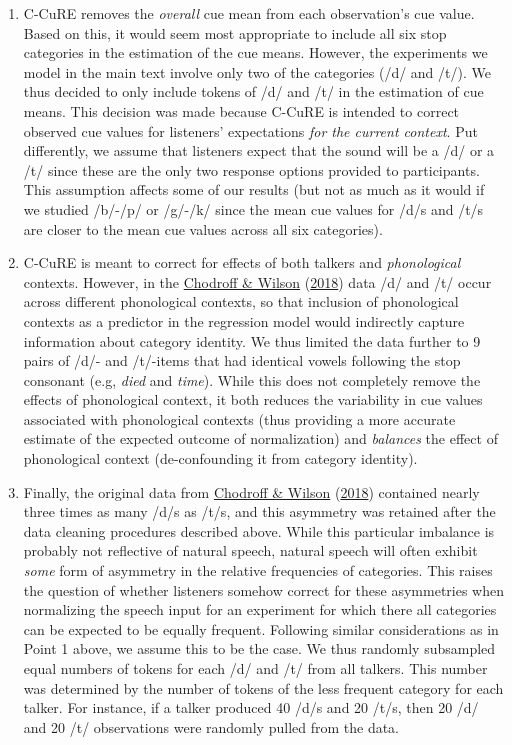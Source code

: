 \documentclass[
  11pt,
  english,
  man,floatsintext]{apa6}
\begin{document}
\begin{enumerate}
\def\labelenumi{\arabic{enumi}.}
\item
  C-CuRE removes the \emph{overall} cue mean from each observation's cue value. Based on this, it would seem most appropriate to include all six stop categories in the estimation of the cue means. However, the experiments we model in the main text involve only two of the categories (/d/ and /t/). We thus decided to only include tokens of /d/ and /t/ in the estimation of cue means. This decision was made because C-CuRE is intended to correct observed cue values for listeners' expectations \emph{for the current context}. Put differently, we assume that listeners expect that the sound will be a /d/ or a /t/ since these are the only two response options provided to participants. This assumption affects some of our results (but not as much as it would if we studied /b/-/p/ or /g/-/k/ since the mean cue values for /d/s and /t/s are closer to the mean cue values across all six categories).
\item
  C-CuRE is meant to correct for effects of both talkers and \emph{phonological} contexts. However, in the \protect\hyperlink{ref-chodroff-wilson2018}{Chodroff \& Wilson} (\protect\hyperlink{ref-chodroff-wilson2018}{2018}) data /d/ and /t/ occur across different phonological contexts, so that inclusion of phonological contexts as a predictor in the regression model would indirectly capture information about category identity. We thus limited the data further to 9 pairs of /d/- and /t/-items that had identical vowels following the stop consonant (e.g, \emph{\emph{d}ied} and \emph{\emph{t}ime}). While this does not completely remove the effects of phonological context, it both reduces the variability in cue values associated with phonological contexts (thus providing a more accurate estimate of the expected outcome of normalization) and \emph{balances} the effect of phonological context (de-confounding it from category identity).
\item
  Finally, the original data from \protect\hyperlink{ref-chodroff-wilson2018}{Chodroff \& Wilson} (\protect\hyperlink{ref-chodroff-wilson2018}{2018}) contained nearly three times as many /d/s as /t/s, and this asymmetry was retained after the data cleaning procedures described above. While this particular imbalance is probably not reflective of natural speech, natural speech will often exhibit \emph{some} form of asymmetry in the relative frequencies of categories. This raises the question of whether listeners somehow correct for these asymmetries when normalizing the speech input for an experiment for which there all categories can be expected to be equally frequent. Following similar considerations as in Point 1 above, we assume this to be the case. We thus randomly subsampled equal numbers of tokens for each /d/ and /t/ from all talkers. This number was determined by the number of tokens of the less frequent category for each talker. For instance, if a talker produced 40 /d/s and 20 /t/s, then 20 /d/ and 20 /t/ observations were randomly pulled from the data.
\end{enumerate}
\end{document}
